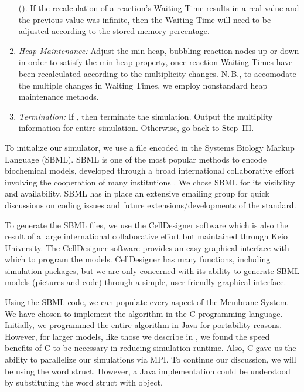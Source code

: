 \documentclass[copyright]{eptcs}
\begin{document}
\begin{enumerate}[{\sc(i)}]
().  If the recalculation of a reaction's Waiting Time 
results in a real value and the previous value was infinite, then the Waiting Time will
need to be adjusted according to the stored memory percentage.
\item  {\it Heap Maintenance:} Adjust the min-heap, bubbling reaction nodes up or down in 
order to satisfy the min-heap property, once reaction Waiting Times have been recalculated
according to the multiplicity changes.  N.\,B., to accomodate the multiple changes in 
Waiting Times, we employ nonstandard heap maintenance methods.
\item  {\it Termination:} If , then terminate the simulation.  
Output the multiplity information for entire simulation.  Otherwise, go back to Step~III.
\end{enumerate}

To initialize our simulator, we use a file encoded in the Systems Biology Markup Language (SBML).  SBML is one of the most popular methods to encode biochemical models, developed through a broad international collaborative effort involving the cooperation of many institutions \cite{hucka03}.  We chose SBML for its visibility and availability.  SBML has in place an extensive emailing group for quick discussions on coding issues and future extensions/developments of the standard.  

To generate the SBML files, we use the CellDesigner software \cite{funahashi03,funahashi08} which is also the result of a large international collaborative effort but maintained through Keio University.  The CellDesigner software provides an easy graphical interface with which to program the models.  CellDesigner has many functions, including simulation packages, but we are only concerned with its ability to generate SBML models (pictures and code) through a simple, user-friendly graphical interface.

















Using the SBML code, we can populate every aspect of the Membrane System.  We have chosen to implement the algorithm in the C programming language.  Initially, we programmed the entire algorithm in Java for portability reasons. However, for larger models, like those we describe in \cite{jack07,jack08,jack08hiv}, we found the speed benefits of C to be necessary in reducing simulation runtime.  Also, C gave us the ability to parallelize our simulations via MPI.  To continue our discussion, we will be using the word struct.  However, a Java implementation could be understood by substituting the word struct with object.
\end{document}
